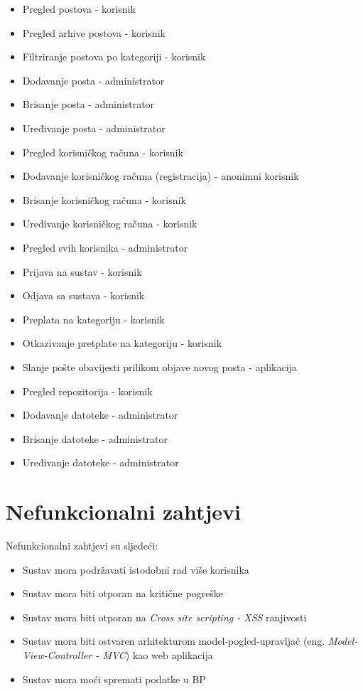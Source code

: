 \documentclass[zavrsni, numeric]{fer}
\begin{document}
 
\begin{itemize}
	\item Pregled postova - korisnik
	\item Pregled arhive postova - korisnik
	\item Filtriranje postova po kategoriji - korisnik
	\item Dodavanje posta - administrator
	\item Brisanje posta - administrator
	\item Uređivanje posta - administrator
	\item Pregled korisničkog računa - korisnik
	\item Dodavanje korisničkog računa (registracija) - anonimni korisnik
	\item Brisanje korisničkog računa - korisnik 
	\item Uređivanje korisničkog računa - korisnik
	\item Pregled svih korisnika - administrator
	\item Prijava na sustav - korisnik 
	\item Odjava sa sustava - korisnik
	\item Preplata na kategoriju - korisnik
	\item Otkazivanje pretplate na kategoriju - korisnik
	\item Slanje pošte obavijesti prilikom objave novog posta - aplikacija
	\item Pregled repozitorija - korisnik
	\item Dodavanje datoteke - administrator
	\item Brisanje datoteke - administrator
	\item Uređivanje datoteke - administrator
\end{itemize}

\section{Nefunkcionalni zahtjevi}
Nefunkcionalni zahtjevi su sljedeći:

\begin{itemize}
	\item Sustav mora podržavati istodobni rad više korisnika
	\item Sustav mora biti otporan na kritične pogreške
	\item Sustav mora biti otporan na \textit{Cross site scripting - XSS}\citep{xss} ranjivosti
	\item Sustav mora biti ostvaren arhitekturom model-pogled-upravljač (eng. \textit{Model-View-Controller - MVC}) kao web aplikacija
	\item Sustav mora moći spremati podatke u BP
\end{itemize}
\end{document}
